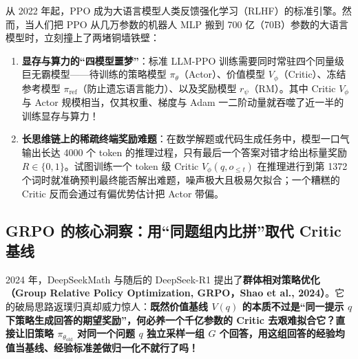 从 2022 年起，PPO 成为大语言模型人类反馈强化学习（RLHF）的标准引擎。然而，当人们把 PPO 从几万参数的机器人 MLP 搬到 700 亿（70B）参数的大语言模型时，立刻撞上了两堵铜墙铁壁：
\begin{enumerate}
  \item \textbf{显存与算力的“四模型噩梦”}：标准 LLM-PPO 训练需要同时常驻四个同量级巨无霸模型——待训练的策略模型 $\pi_\theta$（Actor）、价值模型 $V_\phi$（Critic）、冻结参考模型 $\pi_{\mathrm{ref}}$（防止遗忘语言能力）、以及奖励模型 $r_\psi$（RM）。其中 Critic $V_\phi$ 与 Actor 规模相当，仅其权重、梯度与 Adam 一二阶动量就吞噬了近一半的训练显存与算力！
  \item \textbf{长思维链上的稀疏终端奖励难题}：在数学解题或代码生成任务中，模型一口气输出长达 4000 个 token 的推理过程，只有最后一个答案对错才给出标量奖励 $R \in \{0, 1\}$。试图训练一个 token 级 Critic $V_\phi(q, o_{\le t})$ 在推理进行到第 1372 个词时就准确预判最终能否解出难题，噪声极大且极易欠拟合；一个糟糕的 Critic 反而会通过有偏优势估计把 Actor 带偏。
\end{enumerate}

\subsection{GRPO 的核心洞察：用“同题组内比拼”取代 Critic 基线}

2024 年，DeepSeekMath 与随后的 DeepSeek-R1 提出了\textbf{群体相对策略优化（Group Relative Policy Optimization, GRPO，Shao et al., 2024）}。它的破局思路返璞归真却威力惊人：\textbf{既然价值基线 $V(q)$ 的本质不过是“同一提示 $q$ 下策略生成回答的期望奖励”，何必养一个千亿参数的 Critic 去艰难拟合它？直接让旧策略 $\pi_{\theta_{\mathrm{old}}}$ 对同一个问题 $q$ 独立采样一组 $G$ 个回答，用这组回答的经验均值当基线、经验标准差做归一化不就行了吗！}

